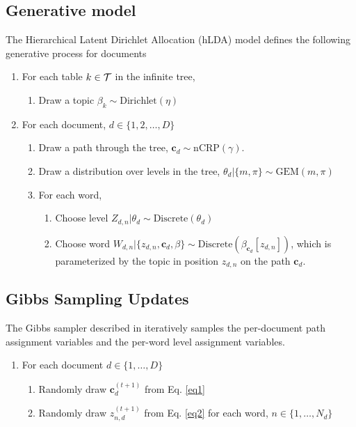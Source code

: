 \documentclass{article}
\begin{document}
\subsection{Generative model}
The Hierarchical Latent Dirichlet Allocation (hLDA) model defines the following generative process for documents
\begin{enumerate}
  \item For each table $ k \in \cal{T}$ in the infinite tree,
  \begin{enumerate}
    \item Draw a topic $\beta_k \sim \text{Dirichlet}(\eta)$
  \end{enumerate}
  \item For each document, $d \in \{1, 2, \dots , D\}$
    \begin{enumerate}
      \item Draw a path through the tree, $\mathbf{c}_d \sim \text{nCRP}(\gamma)$.
      \item Draw a distribution over levels in the tree, $\theta_d | \{m, \pi\} \sim \text{GEM}(m, \pi)$
      \item For each word,
        \begin{enumerate}
          \item Choose level $Z_{d,n} | \theta_d \sim \text{Discrete}(\theta_d)$
          \item Choose word $W_{d,n} | \{ z_{d,n}, \mathbf{c}_d, \beta \} \sim \text{Discrete}(\beta_{\mathbf{c}_d}[z_{d,n}])$, which is parameterized by the topic in position $z_{d,n}$ on the path $\mathbf{c}_d$.
        \end{enumerate}
    \end{enumerate}
\end{enumerate}

\subsection{Gibbs Sampling Updates}
The Gibbs sampler described in \cite{Blei2010} iteratively samples the per-document path assignment variables and the per-word level assignment variables. 
\begin{enumerate}
  \item For each document $d \in \{ 1, \dots , D\}$
  \begin{enumerate}
    \item Randomly draw $\mathbf{c}_d^{(t+1)}$ from Eq. \ref{eq1}
    \item Randomly draw $z_{n,d}^{(t+1)}$ from Eq. \ref{eq2} for each word, $n \in \{1, \dots , N_d\}$
  \end{enumerate}
\end{enumerate}
\end{document}
